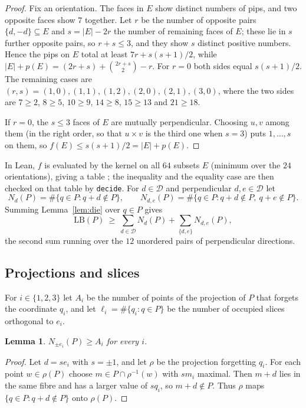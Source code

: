 \documentclass[11pt]{amsart}
\theoremstyle{plain}
\newtheorem{lemma}[theorem]{Lemma}
\theoremstyle{definition}
\newcommand{\D}{\mathcal{D}}
\newcommand{\LB}{\mathrm{LB}}
\begin{document}
\begin{proof}
Fix an orientation. The faces in $E$ show distinct numbers of pips, and two opposite faces show $7$ together. Let $r$ be the number of opposite pairs $\{d,-d\}\subseteq E$ and $s=|E|-2r$ the number of remaining faces of $E$; these lie in $s$ further opposite pairs, so $r+s\le3$, and they show $s$ distinct positive numbers. Hence the pips on $E$ total at least $7r+s(s+1)/2$, while $|E|+p(E)=(2r+s)+\binom{2r+s}{2}-r$. For $r=0$ both sides equal $s(s+1)/2$. The remaining cases are $(r,s)=(1,0),(1,1),(1,2),(2,0),(2,1),(3,0)$, where the two sides are $7\ge2$, $8\ge5$, $10\ge9$, $14\ge8$, $15\ge13$ and $21\ge18$.

If $r=0$, the $s\le3$ faces of $E$ are mutually perpendicular. Choosing $u,v$ among them (in the right order, so that $u\times v$ is the third one when $s=3$) puts $1,\dots,s$ on them, so $f(E)\le s(s+1)/2=|E|+p(E)$.
\end{proof}

In Lean, $f$ is evaluated by the kernel on all $64$ subsets $E$ (minimum over the $24$ orientations), giving a table ; the inequality and the equality case are then checked on that table by \texttt{decide}. For $d\in\D$ and perpendicular $d,e\in\D$ let
\[
N_d(P)=\#\{q\in P: q+d\notin P\},\qquad N_{d,e}(P)=\#\{q\in P: q+d\notin P,\ q+e\notin P\}.
\]
Summing Lemma~\ref{lem:die} over $q\in P$ gives
\begin{equation}\label{eq:LBE}
\LB(P)\ \ge\ \sum_{d\in\D}N_d(P)+\sum_{\{d,e\}}N_{d,e}(P),
\end{equation}
the second sum running over the $12$ unordered pairs of perpendicular directions.

\subsection{Projections and slices}\label{sec:proj}
For $i\in\{1,2,3\}$ let $A_i$ be the number of points of the projection of $P$ that forgets the coordinate $q_i$, and let $\ell_i=\#\{q_i:q\in P\}$ be the number of occupied slices orthogonal to $e_i$.

\begin{lemma}\label{lem:faces}
$N_{\pm e_i}(P)\ge A_i$ for every $i$.
\end{lemma}

\begin{proof}
Let $d=se_i$ with $s=\pm1$, and let $\rho$ be the projection forgetting $q_i$. For each point $w\in\rho(P)$ choose $m\in P\cap\rho^{-1}(w)$ with $sm_i$ maximal. Then $m+d$ lies in the same fibre and has a larger value of $sq_i$, so $m+d\notin P$. Thus $\rho$ maps $\{q\in P:q+d\notin P\}$ onto $\rho(P)$.
\end{proof}
\end{document}
